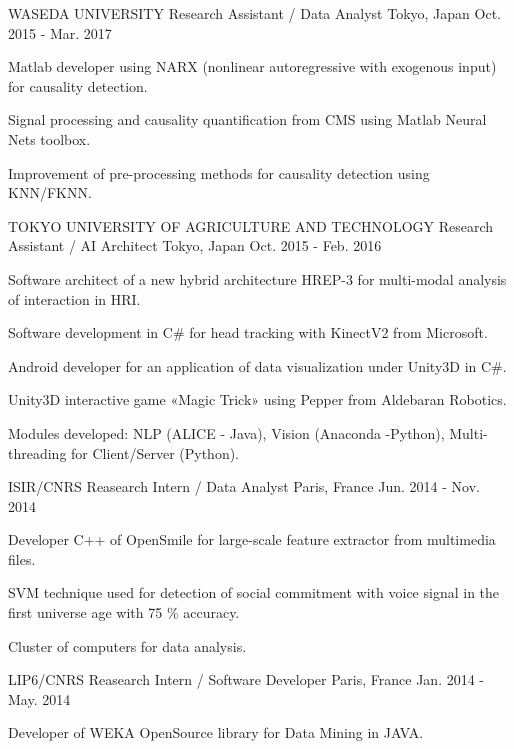 \begin{cventries}
{    }
  \cventry
    {WASEDA UNIVERSITY}
    {Research Assistant / Data Analyst}
    {Tokyo, Japan}
    {Oct. 2015 - Mar. 2017}
    {
      \begin{cvitems}
        \item {Matlab developer using NARX (nonlinear autoregressive with exogenous input) for  causality detection.}
        \item {Signal processing and causality quantification from CMS using Matlab Neural Nets toolbox.}
        \item {Improvement of pre-processing methods for causality detection using KNN/FKNN.}
      \end{cvitems}
    }
  \cventry
    {TOKYO UNIVERSITY OF AGRICULTURE AND TECHNOLOGY}
    {Research Assistant / AI Architect}
    {Tokyo, Japan}
    {Oct. 2015 - Feb. 2016}
    {
      \begin{cvitems}
        \item {Software architect of a new hybrid architecture HREP-3 for multi-modal analysis of interaction in HRI.}
        \item {Software development in C\# for head tracking with KinectV2 from Microsoft.}
        \item {Android developer for an application of data visualization under Unity3D in C\#.}
        \item {Unity3D interactive game «Magic Trick» using Pepper from Aldebaran Robotics.}
         \item{Modules developed: NLP (ALICE - Java), Vision (Anaconda -Python), Multi-threading for Client/Server (Python).}
        \end{cvitems}
    }
    \cventry
    {ISIR/CNRS}
    {Reasearch Intern / Data Analyst}
    {Paris, France}
    {Jun. 2014 - Nov. 2014}
    {
      \begin{cvitems}
       \item{Developer C++ of OpenSmile for large-scale feature extractor from multimedia files.}
       \item {SVM technique used for detection of social commitment with voice signal in the first universe age with 75 \% accuracy.}
       \item {Cluster of computers for data analysis.}
      \end{cvitems}
    }
    \cventry
    {LIP6/CNRS}
    {Reasearch Intern / Software Developer}
    {Paris, France}
    {Jan. 2014 - May. 2014}
    {
      \begin{cvitems}
       \item{Developer of WEKA OpenSource library for Data Mining in JAVA. }

\end{cvitems}}
\end{cventries}
